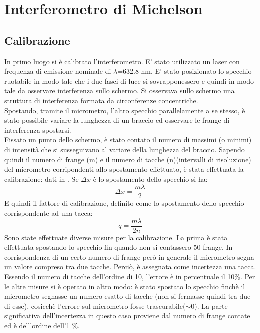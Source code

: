 \section{Interferometro di Michelson}
\subsection{Calibrazione}
In primo luogo si è calibrato l'interferometro. E' stato utilizzato un laser con frequenza di emissione nominale di $\lambda$=632.8 nm. 
E' stato posizionato lo specchio ruotabile in modo tale che i due fasci di luce si sovrapponessero e quindi in modo tale da osservare interferenza sullo schermo.
Si osservava sullo schermo una struttura di interferenza formata da circonferenze concentriche. \\
Spostando, tramite il micrometro, l'altro specchio parallelamente a se stesso, è stato possibile variare la lunghezza di un braccio ed osservare le frange di interferenza spostarsi.\\
Fissato un punto dello schermo, è stato contato il numero di massimi (o minimi) di intensità che si susseguivano al variare della lunghezza del braccio. Sapendo quindi il numero di frange (m) e il numero di tacche (n)(intervalli di risoluzione) del micrometro corripondenti allo spostamento effettuato, è stata effettuata la calibrazione: dati in . Se $\Delta x$ è lo spostamento dello specchio si ha:
\begin{equation}
\Delta x = \frac{m\lambda}{2}
\end{equation}
E quindi il fattore di calibrazione, definito come lo spostamento dello specchio corrispondente ad una tacca:
\begin{equation}
q=\frac{m\lambda}{2n}
\end{equation}
Sono state effettuate diverse misure per la calibrazione. La prima è stata effettuata spostando lo specchio fin quando non si contassero 50 frange. In corrispondenza di un certo numero di frange però in generale il micrometro segna un valore compreso tra due tacche. Perciò, è assegnata come incertezza una tacca. Essendo il numero di tacche dell'ordine di 10, l'errore è in percentuale il 10\%. Per le altre misure si è operato in altro modo: è stato spostato lo specchio finchè il micrometro segnasse un numero esatto di tacche (non si fermasse quindi tra due di esse), cosicchè l'errore sul micrometro fosse trascurabile($\sim$0). La parte significativa dell'incertezza in questo caso proviene dal numero di frange contate ed è dell'ordine dell'1 \%.\\

